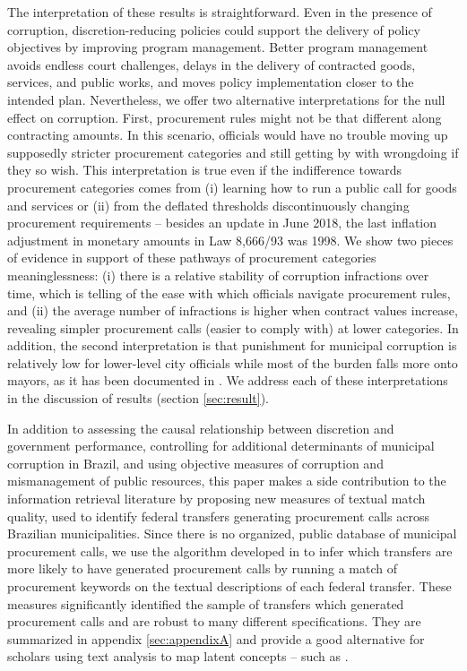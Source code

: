 \documentclass[11pt]{article}
\begin{document}
The interpretation of these results is straightforward. Even in the presence of corruption, discretion-reducing policies could support the delivery of policy objectives by improving program management. Better program management avoids endless court challenges, delays in the delivery of contracted goods, services, and public works, and moves policy implementation closer to the intended plan. Nevertheless, we offer two alternative interpretations for the null effect on corruption. First, procurement rules might not be that different along contracting amounts. In this scenario, officials would have no trouble moving up supposedly stricter procurement categories and still getting by with wrongdoing if they so wish. This interpretation is true even if the indifference towards procurement categories comes from (i) learning how to run a public call for goods and services or (ii) from the deflated thresholds discontinuously changing procurement requirements -- besides an update in June 2018, the last inflation adjustment in monetary amounts in Law 8,666/93 was 1998. We show two pieces of evidence in support of these pathways of procurement categories meaninglessness: (i) there is a relative stability of corruption infractions over time, which is telling of the ease with which officials navigate procurement rules, and (ii) the average number of infractions is higher when contract values increase, revealing simpler procurement calls (easier to comply with) at lower categories. In addition, the second interpretation is that punishment for municipal corruption is relatively low for lower-level city officials while most of the burden falls more onto mayors, as it has been documented in \citet{FinanGovernmentAuditsReduce2018}. We address each of these interpretations in the discussion of results (section \ref{sec:result}).

In addition to assessing the causal relationship between discretion and government performance, controlling for additional determinants of municipal corruption in Brazil, and using objective measures of corruption and mismanagement of public resources, this paper makes a side contribution to the information retrieval literature by proposing new measures of textual match quality, used to identify federal transfers generating procurement calls across Brazilian municipalities. Since there is no organized, public database of municipal procurement calls, we use the algorithm developed in \citet{AssumpcaotextfindDataDrivenText2018} to infer which transfers are more likely to have generated procurement calls by running a match of procurement keywords on the textual descriptions of each federal transfer. These measures significantly identified the sample of transfers which generated procurement calls and are robust to many different specifications. They are summarized in appendix \ref{sec:appendixA} and provide a good alternative for scholars using text analysis to map latent concepts -- such as \citet{LichandCorruptionGoodYour2017}.
\end{document}

